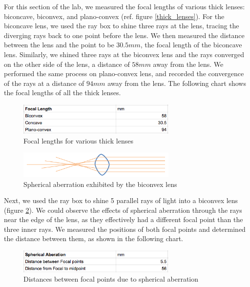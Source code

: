 \documentclass{article}
\begin{document}
For this section of the lab, we measured the focal lengths of various thick
lenses: biconcave, biconvex, and plano-convex (ref. figure \ref{thick_lenses}).
For the biconcave lens, we used the ray box to shine three rays at the lens,
tracing the diverging rays back to one point before the lens. We then measured
the distance between the lens and the point to be $30.5mm$, the focal length of
the biconcave lens. Similarly, we shined three rays at the biconvex lens and the
rays converged on the other side of the lens, a distance of  $58mm$ away from
the lens. We performed the same process on plano-convex lens, and recorded the
convergence of the rays at a distance of $94mm$ away from the lens. The
following chart shows the focal lengths of all the thick lenses. 

\begin{figure}[H]
    \centering
    \includegraphics[width=0.7\textwidth]{charts/thick_lenses_focal_length}
    \caption{Focal lengths for various thick lenses}
    \label{thick_lenses_focal_length}
\end{figure}

\begin{figure}[H]
    \centering
    \includegraphics[width=0.7\textwidth]{charts/spherical_aberration}
    \caption{Spherical aberration exhibited by the biconvex lens}
    \label{spherical_aberration}
\end{figure}

Next, we used the ray box to shine 5 parallel rays of light into a biconvex
lens (figure \ref{spherical_aberration}). We could observe the effects of
spherical aberration through the rays near the edge of the lens, as they
effectively had a different focal point than the three inner rays. We measured
the positions of both focal points and determined the distance between them, as
shown in the following chart.

\begin{figure}[H]
    \centering
    \includegraphics[width=0.7\textwidth]{charts/thick_lenses_spherical_aberration}
    \caption{Distances between focal points due to spherical aberration}
    \label{thick_lenses_spherical_aberration}
\end{figure}
\end{document}

